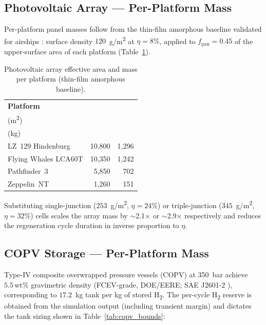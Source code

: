 \documentclass[applsci,article,submit,pdftex,moreauthors]{Definitions/mdpi}
\begin{document}
\subsection{Photovoltaic Array --- Per-Platform Mass}
\label{app:panel_bounds}

Per-platform panel masses follow from the thin-film amorphous baseline validated for airships \cite{Pande2018}: surface density $120$~g/m\textsuperscript{2} at $\eta = 8\%$, applied to $f_\text{pan} = 0.45$ of the upper-surface area of each platform (Table~\ref{tab:panel_bounds}).

\begin{table}[H]
\centering
\footnotesize
\caption{Photovoltaic array effective area and mass per platform (thin-film amorphous baseline).}
\label{tab:panel_bounds}
\renewcommand{\arraystretch}{1.15}
\begin{tabular}{@{} l r r @{}}
\toprule
\textbf{Platform} & \makecell{\textbf{Effective PV area}\\(m\textsuperscript{2})} & \makecell{\textbf{Array mass}\\(kg)} \\
\midrule
LZ~129 Hindenburg     & 10{,}800 & 1{,}296 \\
Flying Whales LCA60T  & 10{,}350 & 1{,}242 \\
Pathfinder~3          &  5{,}850 &   702 \\
Zeppelin~NT           &  1{,}260 &   151 \\
\bottomrule
\end{tabular}
\end{table}

Substituting single-junction ($253$~g/m\textsuperscript{2}, $\eta = 24\%$) or triple-junction ($345$~g/m\textsuperscript{2}, $\eta = 32\%$) cells scales the array mass by ${\sim}$2.1$\times$ or ${\sim}$2.9$\times$ respectively and reduces the regeneration cycle duration in inverse proportion to $\eta$.

\subsection{COPV Storage --- Per-Platform Mass}
\label{app:copv}

Type-IV composite overwrapped pressure vessels (COPV) at 350~bar achieve $5.5\,\mathrm{wt\%}$ gravimetric density (FCEV-grade, DOE/EERE; SAE J2601-2 \cite{SAE2023}), corresponding to $17.2$~kg tank per kg of stored H\textsubscript{2}. The per-cycle H\textsubscript{2} reserve is obtained from the simulation output (including transient margin) and dictates the tank sizing shown in Table~\ref{tab:copv_bounds}:
\end{document}
